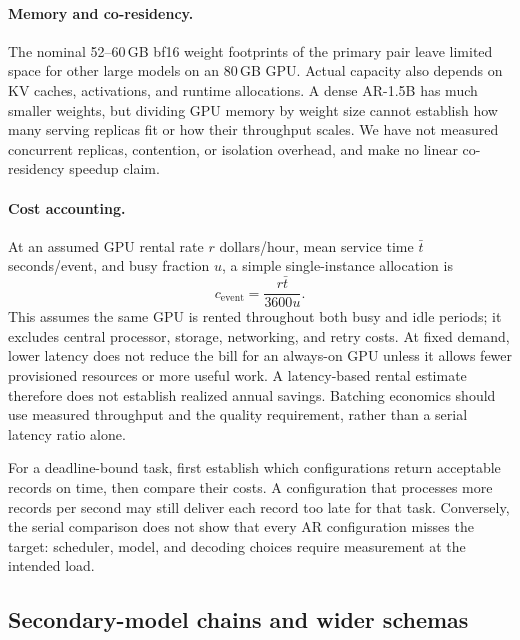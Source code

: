 \paragraph{Memory and co-residency.}
The nominal 52--60\,GB bf16 weight footprints of the primary pair
leave limited space for other large models on an 80\,GB GPU. Actual
capacity also depends on KV caches, activations, and runtime allocations.
A dense AR-1.5B has much smaller weights, but dividing GPU memory by
weight size cannot establish how many serving replicas fit or how their
throughput scales. We have not measured concurrent replicas, contention,
or isolation overhead, and make no linear co-residency speedup claim.

\paragraph{Cost accounting.}
At an assumed GPU rental rate $r$ dollars/hour, mean service time
$\bar t$ seconds/event, and busy fraction $u$, a simple single-instance
allocation is
\begin{equation}
 c_{\mathrm{event}}=\frac{r\bar t}{3600u}.
\end{equation}
This assumes the same GPU is rented throughout both busy and idle periods;
it excludes central processor, storage, networking, and retry costs. At fixed demand,
lower latency does not reduce the bill for an always-on GPU unless it
allows fewer provisioned resources or more useful work. A latency-based rental estimate therefore does not establish realized
annual savings. Batching economics should use measured throughput and
the quality requirement, rather than a serial latency ratio alone.

For a deadline-bound task, first establish which configurations return
acceptable records on time, then compare their costs. A configuration
that processes more records per second may still deliver each record too
late for that task. Conversely, the serial comparison does not show that
every AR configuration misses the target: scheduler, model, and decoding
choices require measurement at the intended load.

\subsection{Secondary-model chains and wider schemas}
